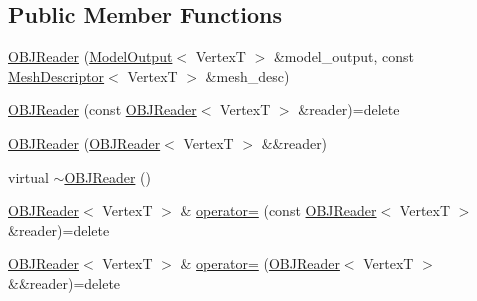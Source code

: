 \subsection*{Public Member Functions}
\begin{DoxyCompactItemize}
\item 
\hyperlink{classmage_1_1_o_b_j_reader_a87c63bd4beb00ce03be5395a37d2a0ac}{O\+B\+J\+Reader} (\hyperlink{structmage_1_1_model_output}{Model\+Output}$<$ VertexT $>$ \&model\+\_\+output, const \hyperlink{structmage_1_1_mesh_descriptor}{Mesh\+Descriptor}$<$ VertexT $>$ \&mesh\+\_\+desc)
\item 
\hyperlink{classmage_1_1_o_b_j_reader_a8bc7d7bb7a5f960b859e84ade1d8aca7}{O\+B\+J\+Reader} (const \hyperlink{classmage_1_1_o_b_j_reader}{O\+B\+J\+Reader}$<$ VertexT $>$ \&reader)=delete
\item 
\hyperlink{classmage_1_1_o_b_j_reader_aa17de8927d3d50e82a286302f34a1d33}{O\+B\+J\+Reader} (\hyperlink{classmage_1_1_o_b_j_reader}{O\+B\+J\+Reader}$<$ VertexT $>$ \&\&reader)
\item 
virtual \hyperlink{classmage_1_1_o_b_j_reader_ad1ff7472ec560a29fe58b594d84dc43e}{$\sim$\+O\+B\+J\+Reader} ()
\item 
\hyperlink{classmage_1_1_o_b_j_reader}{O\+B\+J\+Reader}$<$ VertexT $>$ \& \hyperlink{classmage_1_1_o_b_j_reader_ae3bac172c4179c56fff8a5b0261a54a3}{operator=} (const \hyperlink{classmage_1_1_o_b_j_reader}{O\+B\+J\+Reader}$<$ VertexT $>$ \&reader)=delete
\item 
\hyperlink{classmage_1_1_o_b_j_reader}{O\+B\+J\+Reader}$<$ VertexT $>$ \& \hyperlink{classmage_1_1_o_b_j_reader_ab2dfc9fb0ee6c15ededf97e571bcb11d}{operator=} (\hyperlink{classmage_1_1_o_b_j_reader}{O\+B\+J\+Reader}$<$ VertexT $>$ \&\&reader)=delete
\end{DoxyCompactItemize}
